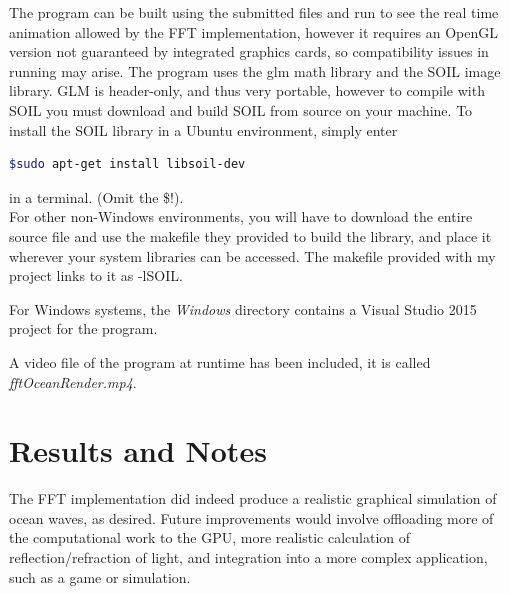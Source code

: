 \documentclass[11pt]{article} %
\begin{document}
\par The program can be built using the submitted files and run to see the real time animation allowed by the FFT implementation, however
it requires an OpenGL version not guaranteed by integrated graphics cards, so compatibility issues in running may arise. The program uses the 
glm math library and the SOIL image library. GLM is header-only, and thus very portable, however to compile with SOIL you must download and
build SOIL from source on your machine.
To install the SOIL library in a Ubuntu environment, simply enter
\begin{lstlisting}[language = bash]
$sudo apt-get install libsoil-dev
\end{lstlisting}
in a terminal. (Omit the \$!).\\
For other non-Windows environments, you will have to download the entire source file and
use the makefile they provided to build the library, and place it wherever your system libraries
can be accessed. The makefile provided with my project links to it as -lSOIL.
\par For Windows systems, the \textit{Windows} directory contains a Visual Studio 2015 project for the program.

\par A video file of the program at runtime has been included, it is called \textit{fftOceanRender.mp4}.

\section*{Results and Notes}

The FFT implementation did indeed produce a realistic graphical simulation of ocean waves, as desired. Future improvements would involve offloading more of the computational work to the GPU, more realistic calculation of reflection/refraction of light, and integration into a more complex application, such as a game or simulation.
\end{document}
